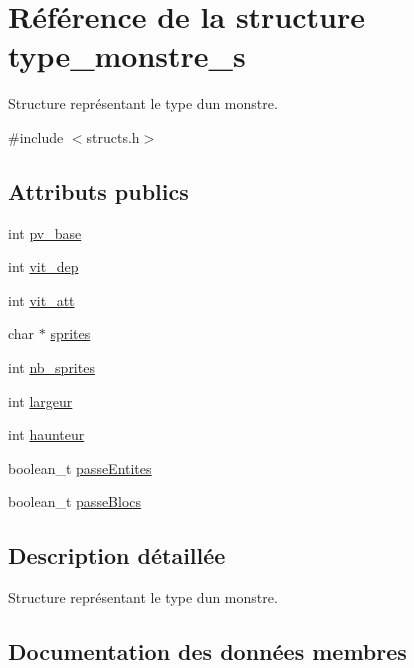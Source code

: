 \hypertarget{structtype__monstre__s}{}\section{Référence de la structure type\+\_\+monstre\+\_\+s}
\label{structtype__monstre__s}


Structure représentant le type d\textquotesingle{}un monstre.  




{\ttfamily \#include $<$structs.\+h$>$}

\subsection*{Attributs publics}
\begin{DoxyCompactItemize}
\item 
int \hyperlink{structtype__monstre__s_a37d1cae3dfb8de6ce15f2601a93cd1cc}{pv\+\_\+base}
\item 
int \hyperlink{structtype__monstre__s_a768470695da3d9377f1e7e97a3c45ed7}{vit\+\_\+dep}
\item 
int \hyperlink{structtype__monstre__s_a5bb66d5b722fc97f901c5eaf7d621fd4}{vit\+\_\+att}
\item 
char $\ast$ \hyperlink{structtype__monstre__s_a20b80d2c595e2a211a48d548cb02f5f3}{sprites}
\item 
int \hyperlink{structtype__monstre__s_afd34506ee621c0e8608bab608cc17e58}{nb\+\_\+sprites}
\item 
int \hyperlink{structtype__monstre__s_aad3de2b9e1e4199ed5c0a1cb43bfc259}{largeur}
\item 
int \hyperlink{structtype__monstre__s_ac5de8e033545707dad2589d421abb672}{haunteur}
\item 
boolean\+\_\+t \hyperlink{structtype__monstre__s_a03f34ddaadae9f002130e70844f142f1}{passe\+Entites}
\item 
boolean\+\_\+t \hyperlink{structtype__monstre__s_a0f60370f9ae95fff9ab024fbf6485df6}{passe\+Blocs}
\end{DoxyCompactItemize}


\subsection{Description détaillée}
Structure représentant le type d\textquotesingle{}un monstre. 

\subsection{Documentation des données membres}
\mbox{\label{structtype__monstre__s_ac5de8e033545707dad2589d421abb672}} 
